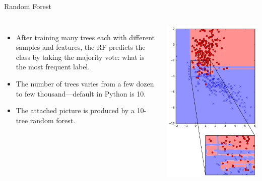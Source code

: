 \documentclass[10pt, aspectratio=169]{beamer} %
\begin{document}
\begin{frame}{Random Forest}
\begin{columns}
\begin{itemize}
\item After training many trees each with different samples and features, 
the RF predicts the class by taking the majority vote: what is the most 
frequent label.
\item The number of trees varies from a few dozen to few thousand---default in Python is 10.
\item The attached picture is produced by a 10-tree random forest.
\end{itemize}
\centerline{\includegraphics[width=1\columnwidth]{RandomForest1.pdf}}
\end{columns}
\end{frame}
\end{document}
